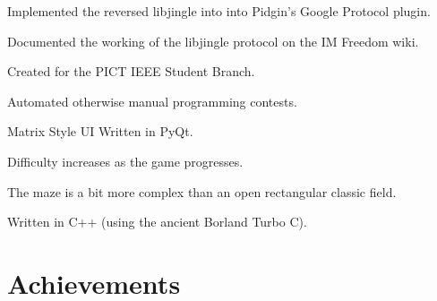 \documentclass[letterpaper]{deedy-resume} %
\begin{document}
\begin{minipage}[t]{0.66\textwidth}
\begin{tightitemize}
\item Implemented the reversed libjingle into into Pidgin's Google Protocol plugin.
\item Documented the working of the libjingle protocol on the IM Freedom wiki.
\end{tightitemize}
\sectionspace %
\begin{tightitemize}
\item Created for the PICT IEEE Student Branch.
\item Automated otherwise manual programming contests.
\item Matrix Style UI Written in PyQt.
\end{tightitemize}
\sectionspace %
\begin{tightitemize}
\item Difficulty increases as the game progresses.
\item The maze is a bit more complex than an open rectangular classic field.
\item Written in C++ (using the ancient Borland Turbo C).
\end{tightitemize}
\sectionspace %
\section{Achievements}
\sectionspace %
\sectionspace %
\end{minipage} %
\end{document}
